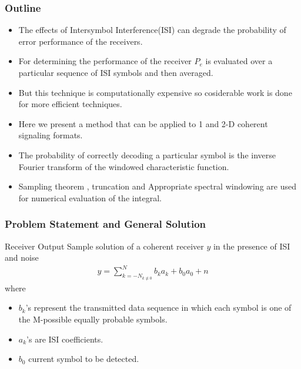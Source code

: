 \documentclass{beamer}
\begin{document}
\begin{frame}
\frametitle{Outline}
\begin{itemize}
\item The effects of Intersymbol Interference(ISI) can degrade the probability of error performance of the receivers.
\item For determining the performance of the receiver $P_e$ is evaluated over a particular sequence of ISI symbols and then averaged.
\item But this technique is computationally expensive so cosiderable work is done for more efficient techniques.
\item Here we present a method that can be applied to 1 and 2-D coherent signaling formats.
\item The probability of correctly decoding a particular symbol is the inverse Fourier transform of the windowed characteristic function.
\item Sampling theorem , truncation and Appropriate spectral windowing are used for numerical evaluation of the integral.
\end{itemize}
\end{frame}
\begin{frame}
\frametitle{Problem Statement and General Solution}
\begin{block}{Receiver Output}
 Sample solution of a coherent receiver $y$ in the presence of ISI and noise
    \begin{align}
     y =  \sum_{{k=-N}_{k\not\equiv0}}^{N} b_ka_k + b_0a_0 +n 
    \end{align} 
    where
\begin{itemize}
    \item $b_k$'s represent the transmitted data sequence in which each symbol is one of the M-possible equally probable symbols.
    \item $a_k$'s are ISI coefficients.
    \item $b_0$ current symbol to be detected.
\end{itemize}
\end{block}
\end{frame}
\end{document}
